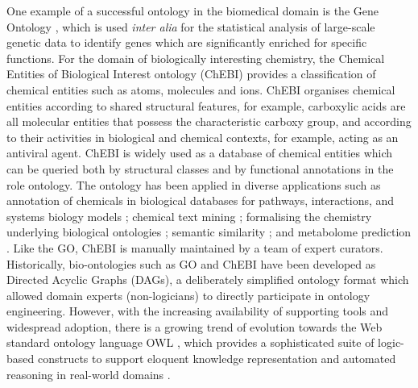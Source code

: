 \documentclass[10pt]{bmc_article}
\newenvironment{bmcformat}{\baselineskip20pt\sloppy\setboolean{publ}{false}}{\baselineskip20pt\sloppy}
\begin{document}
\begin{bmcformat}
One example of a successful ontology in the biomedical domain is the Gene Ontology \cite{go2000}, which is used \textit{inter alia} for the statistical analysis of large-scale genetic data to identify genes which are significantly enriched for specific functions.  For the domain of biologically interesting chemistry, the Chemical Entities of Biological Interest ontology (ChEBI) \cite{chebi2010} provides a classification of chemical entities such as atoms, molecules and ions.  ChEBI organises chemical entities according to shared structural features, for example, carboxylic acids are all molecular entities that possess the characteristic carboxy group, and according to their activities in biological and chemical contexts, for example, acting as an antiviral agent. ChEBI is widely used as a database of chemical entities which can be queried both by structural classes and by functional annotations in the role ontology. The ontology has been applied in diverse applications such as annotation of chemicals in biological databases for pathways, interactions, and systems biology models \cite{matthews2009,libiomodels2010,kerrien2007}; chemical text mining \cite{corbett2006}; formalising the chemistry underlying biological ontologies \cite{mungall2010}; semantic similarity \cite{couto2010}; and metabolome prediction \cite{swainston2010}. Like the GO, ChEBI is manually maintained by a team of expert curators.  Historically, bio-ontologies such as GO and ChEBI have been developed as Directed Acyclic Graphs (DAGs), a deliberately simplified ontology format which allowed domain experts (non-logicians) to directly participate in ontology engineering. However, with the increasing availability of supporting tools and widespread adoption, there is a growing trend of evolution  towards the Web standard ontology language OWL \cite{owlformat}, which provides a sophisticated suite of logic-based constructs to support eloquent knowledge representation and automated reasoning in real-world domains \cite{alterovitz2010}. 


\end{bmcformat}
\end{document}
